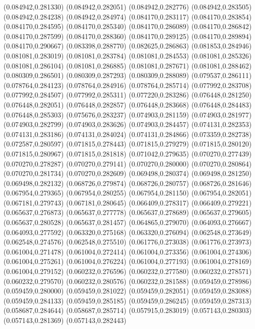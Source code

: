 (0.084942,0.281330)
(0.084942,0.282051)
(0.084942,0.282776)
(0.084942,0.283505)
(0.084942,0.284238)
(0.084942,0.284974)
(0.084170,0.283117)
(0.084170,0.283854)
(0.084170,0.284595)
(0.084170,0.285340)
(0.084170,0.286089)
(0.084170,0.286842)
(0.084170,0.287599)
(0.084170,0.288360)
(0.084170,0.289125)
(0.084170,0.289894)
(0.084170,0.290667)
(0.083398,0.288770)
(0.082625,0.286863)
(0.081853,0.284946)
(0.081081,0.283019)
(0.081081,0.283784)
(0.081081,0.284553)
(0.081081,0.285326)
(0.081081,0.286104)
(0.081081,0.286885)
(0.081081,0.287671)
(0.081081,0.288462)
(0.080309,0.286501)
(0.080309,0.287293)
(0.080309,0.288089)
(0.079537,0.286111)
(0.078764,0.284123)
(0.078764,0.284916)
(0.078764,0.285714)
(0.077992,0.283708)
(0.077992,0.284507)
(0.077992,0.285311)
(0.077220,0.283286)
(0.076448,0.281250)
(0.076448,0.282051)
(0.076448,0.282857)
(0.076448,0.283668)
(0.076448,0.284483)
(0.076448,0.285303)
(0.075676,0.283237)
(0.074903,0.281159)
(0.074903,0.281977)
(0.074903,0.282799)
(0.074903,0.283626)
(0.074903,0.284457)
(0.074131,0.282353)
(0.074131,0.283186)
(0.074131,0.284024)
(0.074131,0.284866)
(0.073359,0.282738)
(0.072587,0.280597)
(0.071815,0.278443)
(0.071815,0.279279)
(0.071815,0.280120)
(0.071815,0.280967)
(0.071815,0.281818)
(0.071042,0.279635)
(0.070270,0.277439)
(0.070270,0.278287)
(0.070270,0.279141)
(0.070270,0.280000)
(0.070270,0.280864)
(0.070270,0.281734)
(0.070270,0.282609)
(0.069498,0.280374)
(0.069498,0.281250)
(0.069498,0.282132)
(0.068726,0.279874)
(0.068726,0.280757)
(0.068726,0.281646)
(0.067954,0.279365)
(0.067954,0.280255)
(0.067954,0.281150)
(0.067954,0.282051)
(0.067181,0.279743)
(0.067181,0.280645)
(0.066409,0.278317)
(0.066409,0.279221)
(0.065637,0.276873)
(0.065637,0.277778)
(0.065637,0.278689)
(0.065637,0.279605)
(0.065637,0.280528)
(0.065637,0.281457)
(0.064865,0.279070)
(0.064093,0.276667)
(0.064093,0.277592)
(0.063320,0.275168)
(0.063320,0.276094)
(0.062548,0.273649)
(0.062548,0.274576)
(0.062548,0.275510)
(0.061776,0.273038)
(0.061776,0.273973)
(0.061004,0.271478)
(0.061004,0.272414)
(0.061004,0.273356)
(0.061004,0.274306)
(0.061004,0.275261)
(0.061004,0.276224)
(0.061004,0.277193)
(0.061004,0.278169)
(0.061004,0.279152)
(0.060232,0.276596)
(0.060232,0.277580)
(0.060232,0.278571)
(0.060232,0.279570)
(0.060232,0.280576)
(0.060232,0.281588)
(0.059459,0.278986)
(0.059459,0.280000)
(0.059459,0.281022)
(0.059459,0.282051)
(0.059459,0.283088)
(0.059459,0.284133)
(0.059459,0.285185)
(0.059459,0.286245)
(0.059459,0.287313)
(0.058687,0.284644)
(0.058687,0.285714)
(0.057915,0.283019)
(0.057143,0.280303)
(0.057143,0.281369)
(0.057143,0.282443)
